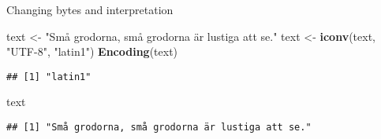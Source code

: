 \documentclass[ignorenonframetext,]{beamer}
\newenvironment{Shaded}{\begin{snugshade}}{\end{snugshade}}
\newcommand{\KeywordTok}[1]{\textcolor[rgb]{0.13,0.29,0.53}{\textbf{{#1}}}}
\newcommand{\StringTok}[1]{\textcolor[rgb]{0.31,0.60,0.02}{{#1}}}
\newcommand{\NormalTok}[1]{{#1}}
\begin{document}
\begin{frame}[fragile]{Changing bytes and interpretation}

\begin{Shaded}
\begin{Highlighting}[]
\NormalTok{text <-}\StringTok{ "Små grodorna, små grodorna är lustiga att se."}
\NormalTok{text <-}\StringTok{ }\KeywordTok{iconv}\NormalTok{(text, }\StringTok{"UTF-8"}\NormalTok{, }\StringTok{"latin1"}\NormalTok{)}
\KeywordTok{Encoding}\NormalTok{(text)}
\end{Highlighting}
\end{Shaded}

\begin{verbatim}
## [1] "latin1"
\end{verbatim}

\begin{Shaded}
\begin{Highlighting}[]
\NormalTok{text}
\end{Highlighting}
\end{Shaded}

\begin{verbatim}
## [1] "Små grodorna, små grodorna är lustiga att se."
\end{verbatim}

\end{frame}
\end{document}
